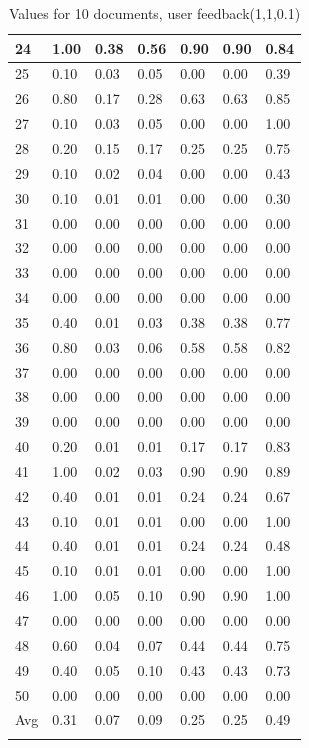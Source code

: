 \documentclass[12pt]{article}
\begin{document}
\begin{longtable}[c]{|l|l|l|l|l|l|l|}
  24 & 1.00 & 0.38 & 0.56 & 0.90 & 0.90 & 0.84 \\ \hline
  25 & 0.10 & 0.03 & 0.05 & 0.00 & 0.00 & 0.39 \\ \hline
  26 & 0.80 & 0.17 & 0.28 & 0.63 & 0.63 & 0.85 \\ \hline
  27 & 0.10 & 0.03 & 0.05 & 0.00 & 0.00 & 1.00 \\ \hline
  28 & 0.20 & 0.15 & 0.17 & 0.25 & 0.25 & 0.75 \\ \hline
  29 & 0.10 & 0.02 & 0.04 & 0.00 & 0.00 & 0.43 \\ \hline
  30 & 0.10 & 0.01 & 0.01 & 0.00 & 0.00 & 0.30 \\ \hline
  31 & 0.00 & 0.00 & 0.00 & 0.00 & 0.00 & 0.00 \\ \hline
  32 & 0.00 & 0.00 & 0.00 & 0.00 & 0.00 & 0.00 \\ \hline
  33 & 0.00 & 0.00 & 0.00 & 0.00 & 0.00 & 0.00 \\ \hline
  34 & 0.00 & 0.00 & 0.00 & 0.00 & 0.00 & 0.00 \\ \hline
  35 & 0.40 & 0.01 & 0.03 & 0.38 & 0.38 & 0.77 \\ \hline
  36 & 0.80 & 0.03 & 0.06 & 0.58 & 0.58 & 0.82 \\ \hline
  37 & 0.00 & 0.00 & 0.00 & 0.00 & 0.00 & 0.00 \\ \hline
  38 & 0.00 & 0.00 & 0.00 & 0.00 & 0.00 & 0.00 \\ \hline
  39 & 0.00 & 0.00 & 0.00 & 0.00 & 0.00 & 0.00 \\ \hline
  40 & 0.20 & 0.01 & 0.01 & 0.17 & 0.17 & 0.83 \\ \hline
  41 & 1.00 & 0.02 & 0.03 & 0.90 & 0.90 & 0.89 \\ \hline
  42 & 0.40 & 0.01 & 0.01 & 0.24 & 0.24 & 0.67 \\ \hline
  43 & 0.10 & 0.01 & 0.01 & 0.00 & 0.00 & 1.00 \\ \hline
  44 & 0.40 & 0.01 & 0.01 & 0.24 & 0.24 & 0.48 \\ \hline
  45 & 0.10 & 0.01 & 0.01 & 0.00 & 0.00 & 1.00 \\ \hline
  46 & 1.00 & 0.05 & 0.10 & 0.90 & 0.90 & 1.00 \\ \hline
  47 & 0.00 & 0.00 & 0.00 & 0.00 & 0.00 & 0.00 \\ \hline
  48 & 0.60 & 0.04 & 0.07 & 0.44 & 0.44 & 0.75 \\ \hline
  49 & 0.40 & 0.05 & 0.10 & 0.43 & 0.43 & 0.73 \\ \hline
  50 & 0.00 & 0.00 & 0.00 & 0.00 & 0.00 & 0.00 \\ \hline
  Avg & 0.31 & 0.07 & 0.09 & 0.25 & 0.25 & 0.49 \\ \hline
  \caption{Values for 10 documents, user feedback(1,1,0.1)}
  \label{tab:tab1} 
  \end{longtable}
\end{document}

